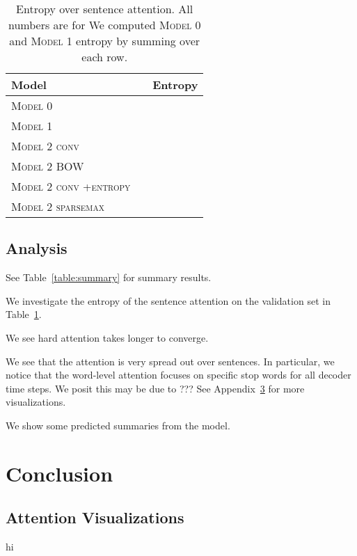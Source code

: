 \documentclass[11pt]{report}
\begin{document}
\begin{table}[h]
\centering
\begin{tabular}{llr}
\toprule
Model & & Entropy \\
\midrule
\textsc{Model 0} \\
\textsc{Model 1} \\
\textsc{Model 2 conv} \\
\textsc{Model 2 BOW} \\
\textsc{Model 2 conv +entropy}  \\
\textsc{Model 2 sparsemax} \\
\bottomrule
\end{tabular}
\caption{Entropy over sentence attention. All numbers are for  We computed \textsc{Model 0} and \textsc{Model 1} entropy by summing over each row.}
\label{table:entropy}
\end{table}

\section{Analysis}

See Table~\ref{table:summary} for summary results.

We investigate the entropy of the sentence attention on the validation set in Table~\ref{table:entropy}.



We see hard attention takes longer to converge.

We see that the attention is very spread out over sentences. In particular, we notice that the word-level attention focuses on specific stop words for all decoder time steps. We posit this may be due to ???
See Appendix~\ref{appendix:attn} for more visualizations.

We show some predicted summaries from the model.



\chapter{Conclusion}






\begin{appendices}

\chapter{Attention Visualizations}
\label{appendix:attn}
hi

\end{appendices}
\end{document}
